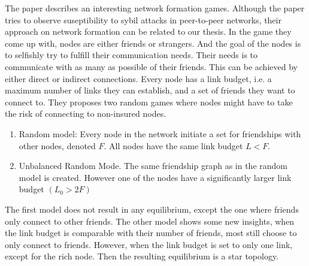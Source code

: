 The paper \cite{danezis2006network} describes an interesting network formation games. Although the paper tries to observe suseptibility to sybil attacks in peer-to-peer networks, their approach on network formation can be related to our thesis. In the game they come up with, nodes are either friends or strangers. And the goal of the nodes is to selfishly try to fulfill their communication needs. Their needs is to communicate with as many as possible of their friends. This can be achieved by either direct or indirect connections. Every node has a link budget, i.e. a maximum number of links they can establish, and a set of friends they want to connect to. 
They proposes two random games where nodes might have to take the risk of connecting to non-insured nodes.
\begin{enumerate}
\item Random model: Every node in the network initiate a set for friendships with other nodes, denoted $F$. All nodes have the same link budget $L<F$. 
\item Unbalanced Random Mode. The same friendship graph as in the random model is created. However one of the nodes have a significantly larger link budget $(L_{0} > 2 F)$
\end{enumerate}
The first model does not result in any equilibrium, except the one where friends only connect to other friends.
The other model shows some new insights, when the link budget is comparable with their number of friends, most still choose to only connect to friends. However, when the link budget is set to only one link, except for the rich node. Then the resulting equilibrium is a star topology. 



